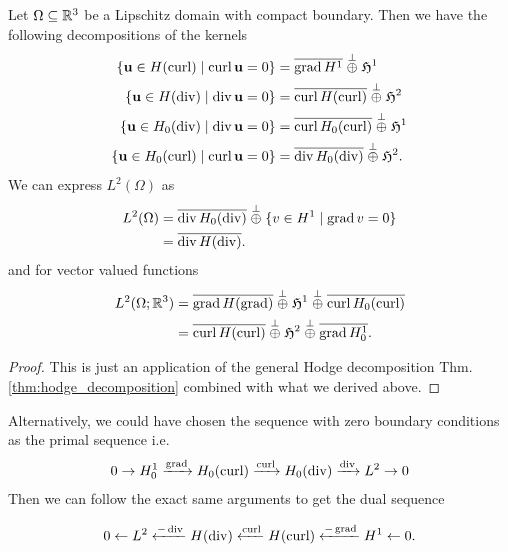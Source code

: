 \documentclass[../main.tex]{subfiles}
\begin{document}
\begin{theorem}\label{thm:hodge_decomposition_in_3d}
    Let $\Omega \subseteq \mathbb{R}^3$ be a Lipschitz domain with compact boundary. Then we have the 
    following decompositions of the kernels
    \begin{align*}
        \{ \mathbf{u} \in H(\operatorname{curl}) \mid \operatorname{curl} \mathbf{u} = 0\}
        &= \overline{\operatorname{grad} H^1} \stackrel{\perp}{\oplus} 
            \mathfrak{H}^1
        \\ \{ \mathbf{u} \in H(\operatorname{div}) \mid \operatorname{div} \mathbf{u} = 0\}
        &= \overline{\operatorname{curl} H(\operatorname{curl})} \stackrel{\perp}{\oplus} 
            \mathfrak{H}^2
        \\ \{ \mathbf{u} \in H_0(\operatorname{div}) \mid \operatorname{div} \mathbf{u} = 0\}
        &= \overline{\operatorname{curl} H_0(\operatorname{curl})} \stackrel{\perp}{\oplus} 
            \mathfrak{H}^1
        \\ \{ \mathbf{u} \in H_0(\operatorname{curl}) \mid \operatorname{curl} \mathbf{u} = 0\}
        &= \overline{\operatorname{div} H_0(\operatorname{div})} \stackrel{\perp}{\oplus} 
            \mathfrak{H}^2.
    \end{align*}
    We can express $L^2(\Omega)$ as
    \begin{align*}
        L^2(\Omega) &= \overline{\operatorname{div} H_0(\operatorname{div})} \stackrel{\perp}{\oplus} 
            \{ v \in H^1 \mid \operatorname{grad} v = 0 \}
        \\ &= \overline{\operatorname{div} H(\operatorname{div})}.
    \end{align*}
    and for vector valued functions
    \begin{align*}
        L^2(\Omega;\mathbb{R}^3) &= \overline{\operatorname{grad} H(\operatorname{grad})} 
            \stackrel{\perp}{\oplus} \mathfrak{H}^1 
            \stackrel{\perp}{\oplus} \overline{\operatorname{curl} H_0(\operatorname{curl})} 
        \\ &= \overline{\operatorname{curl} H(\operatorname{curl})}
            \stackrel{\perp}{\oplus} \mathfrak{H}^2
            \stackrel{\perp}{\oplus} \overline{\operatorname{grad} H^1_0}.
    \end{align*}
\end{theorem}
\begin{proof}
    This is just an application of the general Hodge decomposition 
    Thm.\,\ref{thm:hodge_decomposition} combined with what we derived above.
\end{proof}


\begin{remark}
    Alternatively, we could have chosen the sequence with zero boundary conditions
    as the primal sequence i.e. 
    \begin{align*}
        0 \rightarrow H^1_0 \xrightarrow{\operatorname{grad}} H_0(\operatorname{curl})
        \xrightarrow{\operatorname{curl}} H_0(\operatorname{div}) 
        \xrightarrow{\operatorname{div}} L^2 \rightarrow 0
    \end{align*}
    Then we can follow the exact same arguments to get the dual sequence 

    \begin{align*}
        0 \leftarrow L^2 \xleftarrow{-\operatorname{div}} H(\operatorname{div})
            \xleftarrow{\operatorname{curl}} H(\operatorname{curl}) 
            \xleftarrow{-\operatorname{grad}} H^1 \leftarrow 0.
    \end{align*}
\end{remark}
\end{document}
